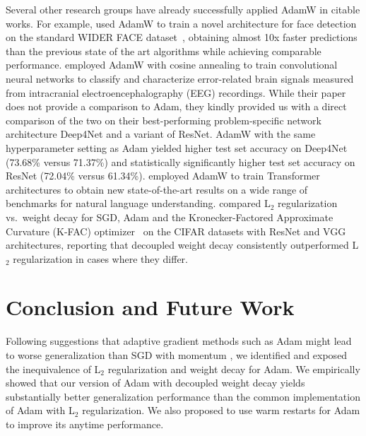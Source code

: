 \documentclass[usenames,dvipsnames]{article} %
\begin{document}
Several other research groups have already successfully applied AdamW in citable works.
For example, \citet{2018arXiv180406559W} used AdamW to train a novel architecture for face detection on the standard WIDER FACE dataset~\citep{yang2016wider}, obtaining almost 10x faster predictions than the previous state of the art algorithms while achieving comparable performance. 
\citet{volker2018intracranial} employed AdamW with cosine annealing to train convolutional neural networks to classify and characterize error-related brain signals measured from intracranial electroencephalography (EEG) recordings.
While their paper does not provide a comparison to Adam, they kindly provided us with a direct comparison of the two on their best-performing problem-specific network architecture Deep4Net and a variant of ResNet. AdamW  with the same hyperparameter setting as Adam yielded higher test set accuracy on Deep4Net (73.68\% versus 71.37\%) and statistically significantly higher test set accuracy on ResNet (72.04\% versus 61.34\%). 
\citet{radford2018improving} employed AdamW 
to train Transformer~\citep{vaswani2017attention} architectures to obtain new state-of-the-art results on a wide range of benchmarks for natural language understanding. \citet{zhang2018three} compared L$_2$ regularization vs.\ weight decay for SGD, Adam and the Kronecker-Factored Approximate Curvature (K-FAC) optimizer~\citep{martens2015optimizing} on the CIFAR datasets with ResNet and VGG architectures, reporting that decoupled weight decay consistently outperformed L$_2$ regularization in cases where they differ. 

\section{Conclusion and Future Work}

Following suggestions that adaptive gradient methods such as Adam might lead to worse generalization than SGD with momentum \citep{wilson2017marginal}, we identified and exposed %
the inequivalence of L$_2$ regularization and weight decay for Adam. %
We empirically showed that our version of Adam with decoupled weight decay %
yields substantially better generalization performance than the common implementation of Adam with L$_2$ regularization. We also proposed to use warm restarts for Adam to improve its anytime  performance. 
\end{document}
